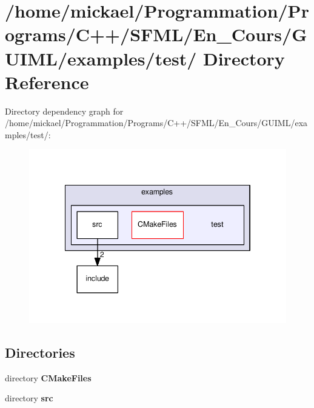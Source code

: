 \section{/home/mickael/\-Programmation/\-Programs/\-C++/\-S\-F\-M\-L/\-En\-\_\-\-Cours/\-G\-U\-I\-M\-L/examples/test/ Directory Reference}
\label{dir_3a924b3abf8b56117854c966c1819bec}
Directory dependency graph for /home/mickael/\-Programmation/\-Programs/\-C++/\-S\-F\-M\-L/\-En\-\_\-\-Cours/\-G\-U\-I\-M\-L/examples/test/\-:\nopagebreak
\begin{figure}[H]
\begin{center}
\leavevmode
\includegraphics[width=342pt]{dir_3a924b3abf8b56117854c966c1819bec_dep}
\end{center}
\end{figure}
\subsection*{Directories}
\begin{DoxyCompactItemize}
\item 
directory {\bf C\-Make\-Files}
\item 
directory {\bf src}
\end{DoxyCompactItemize}
